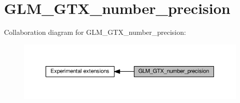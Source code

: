 \hypertarget{group__gtx__number__precision}{}\section{G\+L\+M\+\_\+\+G\+T\+X\+\_\+number\+\_\+precision}
\label{group__gtx__number__precision}
Collaboration diagram for G\+L\+M\+\_\+\+G\+T\+X\+\_\+number\+\_\+precision\+:
\nopagebreak
\begin{figure}[H]
\begin{center}
\leavevmode
\includegraphics[width=350pt]{dc/db7/group__gtx__number__precision}
\end{center}
\end{figure}

